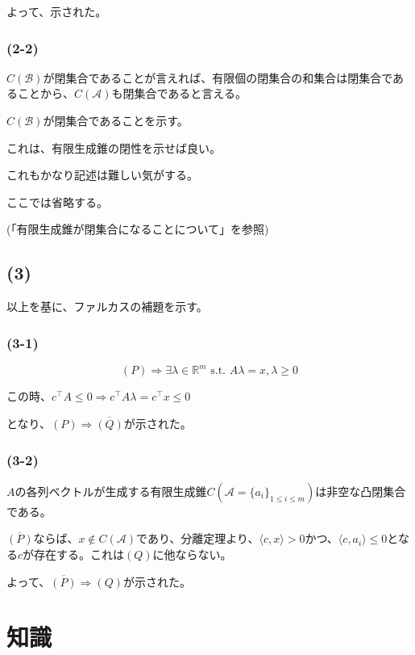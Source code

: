 \documentclass[a4paper, 10pt, dvipdfmx]{jlreq}
\begin{document}
よって、示された。

\subsubsection*{(2-2)}

$C(\mathcal{B})$が閉集合であることが言えれば、有限個の閉集合の和集合は閉集合であることから、$C(\mathcal{A})$も閉集合であると言える。

$C(\mathcal{B})$が閉集合であることを示す。

これは、有限生成錐の閉性を示せば良い。

これもかなり記述は難しい気がする。

ここでは省略する。

(「有限生成錐が閉集合になることについて」を参照)

\subsection*{(3)}

以上を基に、ファルカスの補題を示す。

\subsubsection*{(3-1)}

\begin{equation*}
  (P)   \Rightarrow \exists \lambda \in \mathbb{R}^m \text{ s.t. } A\lambda =x,\lambda \geq 0
\end{equation*}

この時、$c^\top A \leq 0 \Rightarrow c^\top A\lambda =c^\top x \leq 0$

となり、$(P)\Rightarrow \overline{(Q)}$が示された。

\subsubsection*{(3-2)}

$A$の各列ベクトルが生成する有限生成錐$C(\mathcal{A}=\{a_i\}_{1\leq i \leq m})$は非空な凸閉集合である。

$\overline{(P)}$ならば、$x \notin C(\mathcal{A})$であり、分離定理より、$\langle c,x\rangle >0$かつ、$\langle c,a_i\rangle \leq 0$となる$c$が存在する。これは$(Q)$に他ならない。

よって、$\overline{(P)}\Rightarrow (Q)$が示された。

\section{知識}
\end{document}
